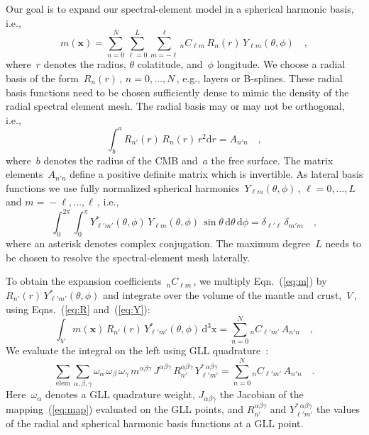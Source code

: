 \documentclass[extra,mreferee]{gji}
\begin{document}
Our goal is to expand our spectral-element model in a spherical harmonic basis, i.e.,
\begin{equation}
    m(\mathbf{x})=\sum_{n=0}^N\sum_{\ell = 0}^L\sum_{m=-\ell}^\ell {}_nC_{\ell m}\,R_n(r)\,Y_{\ell m}(\theta,\phi)
    \quad ,
    \label{eq:m}
\end{equation}
where~$r$ denotes the radius, $\theta$ colatitude, and~$\phi$ longitude.
We choose a radial basis of the form~$R_n(r)$\,, $n=0,\ldots,N$\,,
e.g., layers or B-splines.
These radial basis functions need to be chosen sufficiently dense to mimic the density of the radial spectral element mesh.
The radial basis may or may not be orthogonal,
i.e.,
\begin{equation}
    \int_b^a R_{n'}(r)\,R_{n}(r)\,r^2\mathrm{d}r = A_{n'n}
    \quad ,
    \label{eq:R}
\end{equation}
where~$b$ denotes the radius of the CMB and~$a$ the free surface.
The matrix elements~$A_{n'n}$ define a positive definite matrix which is invertible.
As lateral basis functions we use fully normalized spherical harmonics~$Y_{\ell m}(\theta,\phi)$\,, $\ell=0,\ldots,L$ and $m=\mbox{}-\ell,\ldots,\ell$\,, i.e.,~\citep{DT98}
\begin{equation}
    \int_0^{2\pi}\int_0^\pi Y^*_{\ell'm'}(\theta,\phi)\,Y_{\ell m}(\theta,\phi)\,\sin\theta\,\mathrm{d}\theta\,\mathrm{d}\phi = \delta_{\ell' \ell}\,\delta_{m'm}
    \quad ,
    \label{eq:Y}
\end{equation}
where an asterisk denotes complex conjugation.
The maximum degree~$L$ needs to be chosen to resolve the spectral-element mesh laterally.

To obtain the expansion coefficients~${}_nC_{\ell m}$\,, we multiply Eqn.~(\ref{eq:m}) by
$R_{n'}(r)\,Y^*_{\ell' m'}(\theta,\phi)$ and integrate over the volume of the mantle and crust,~$V$\,, using Eqns.~(\ref{eq:R} and~(\ref{eq:Y}):
\begin{equation}
    \int_V m(\mathbf{x})\,R_{n'}(r)\,Y^*_{\ell' m'}(\theta,\phi)\,\mathrm{d}^3\mathrm{x}=\sum_{n=0}^N {}_nC_{\ell' m'}\,A_{n'n}
    \quad ,
\end{equation}
We evaluate the integral on the left using GLL quadrature~\citep{KoTr99}:
\begin{equation}
    \sum_{\mathrm{elem}}\sum_{\alpha,\beta,\gamma}\omega_\alpha\,\omega_\beta\,\omega_\gamma\,m^{\alpha\beta\gamma}\,J^{\alpha\beta\gamma}\,R_{n'}^{\alpha\beta\gamma}\,Y_{\ell'm'}^{*\,\alpha\beta\gamma}
    =\sum_{n=0}^N {}_nC_{\ell' m'}\,A_{n'n}
    \quad .
\end{equation}
Here~$\omega_\alpha$ denotes a GLL quadrature weight,
$J_{\alpha\beta\gamma}$ the Jacobian of the mapping~(\ref{eq:map}) evaluated on the GLL points,
and $R_{n'}^{\alpha\beta\gamma}$ and $Y_{\ell'm'}^{*\,\alpha\beta\gamma}$ the values of the radial and spherical harmonic basis functions at a GLL point.
\end{document}

